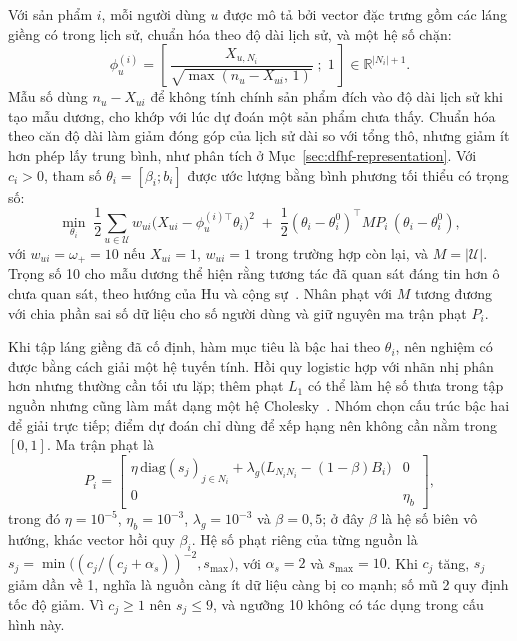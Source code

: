 Với sản phẩm $i$, mỗi người dùng $u$ được mô tả bởi vector đặc trưng gồm các láng giềng có trong lịch sử, chuẩn hóa theo độ dài lịch sử, và một hệ số chặn:
\begin{equation}
\phi_u^{(i)} = \left[\, \frac{X_{u,N_i}}{\sqrt{\max(n_u - X_{ui},\,1)}} \;;\; 1 \,\right] \in \mathbb{R}^{|N_i|+1}.
\label{eq:grnr-feature}
\end{equation}
Mẫu số dùng $n_u-X_{ui}$ để không tính chính sản phẩm đích vào độ dài lịch sử khi tạo mẫu dương, cho khớp với lúc dự đoán một sản phẩm chưa thấy. Chuẩn hóa theo căn độ dài làm giảm đóng góp của lịch sử dài so với tổng thô, nhưng giảm ít hơn phép lấy trung bình, như phân tích ở Mục~\ref{sec:dfhf-representation}. Với $c_i>0$, tham số $\theta_i=[\beta_i;b_i]$ được ước lượng bằng bình phương tối thiểu có trọng số:
\begin{equation}
\min_{\theta_i}\; \frac12\sum_{u\in\mathcal{U}} w_{ui}\bigl(X_{ui} - \phi_u^{(i)\top}\theta_i\bigr)^2 \;+\; \frac12(\theta_i-\theta_i^0)^\top M P_i\,(\theta_i-\theta_i^0),
\label{eq:grnr-objective}
\end{equation}
với $w_{ui}=\omega_+=10$ nếu $X_{ui}=1$, $w_{ui}=1$ trong trường hợp còn lại, và $M=|\mathcal{U}|$. Trọng số 10 cho mẫu dương thể hiện rằng tương tác đã quan sát đáng tin hơn ô chưa quan sát, theo hướng của Hu và cộng sự~\cite{hu2008wmf}. Nhân phạt với $M$ tương đương với chia phần sai số dữ liệu cho số người dùng và giữ nguyên ma trận phạt $P_i$.

Khi tập láng giềng đã cố định, hàm mục tiêu là bậc hai theo $\theta_i$, nên nghiệm có được bằng cách giải một hệ tuyến tính. Hồi quy logistic hợp với nhãn nhị phân hơn nhưng thường cần tối ưu lặp; thêm phạt $L_1$ có thể làm hệ số thưa trong tập nguồn nhưng cũng làm mất dạng một hệ Cholesky~\cite[Mục~6.1, 6.3]{boyd2004convex}. Nhóm chọn cấu trúc bậc hai để giải trực tiếp; điểm dự đoán chỉ dùng để xếp hạng nên không cần nằm trong $[0,1]$. Ma trận phạt là
\begin{equation}
P_i = \begin{bmatrix} \eta\,\mathrm{diag}(s_j)_{j\in N_i} + \lambda_g\bigl(L_{N_iN_i} - (1-\beta)B_i\bigr) & 0 \\ 0 & \eta_b \end{bmatrix},
\label{eq:grnr-precision}
\end{equation}
trong đó $\eta=10^{-5}$, $\eta_b=10^{-3}$, $\lambda_g=10^{-3}$ và $\beta=0{,}5$; ở đây $\beta$ là hệ số biên vô hướng, khác vector hồi quy $\beta_i$. Hệ số phạt riêng của từng nguồn là $s_j=\min\bigl((c_j/(c_j+\alpha_s))^{-2},s_{\max}\bigr)$, với $\alpha_s=2$ và $s_{\max}=10$. Khi $c_j$ tăng, $s_j$ giảm dần về 1, nghĩa là nguồn càng ít dữ liệu càng bị co mạnh; số mũ 2 quy định tốc độ giảm. Vì $c_j\ge1$ nên $s_j\le9$, và ngưỡng 10 không có tác dụng trong cấu hình này.

